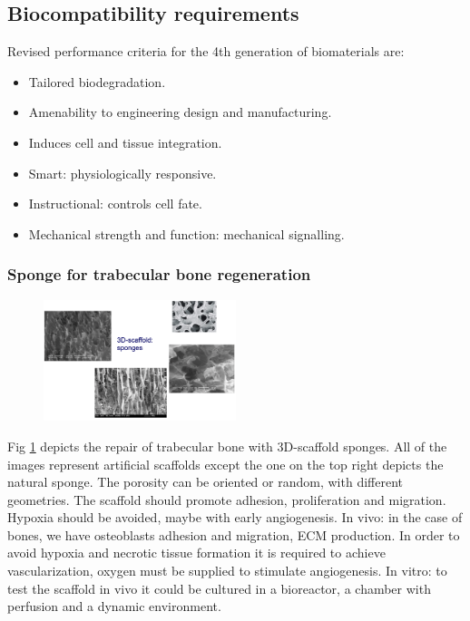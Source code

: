     \subsection{Biocompatibility requirements}
    Revised performance criteria for the 4th generation of biomaterials are:

    \begin{multicols}{2}
        \begin{itemize}
            \item Tailored biodegradation.
            \item Amenability to engineering design and manufacturing.
            \item Induces cell and tissue integration.
            \item Smart: physiologically responsive.
            \item Instructional: controls cell fate.
            \item Mechanical strength and function: mechanical signalling.
        \end{itemize}
    \end{multicols}

        \subsubsection{Sponge for trabecular bone regeneration}
        \begin{figure}[h]
            \centering
            \includegraphics[width=0.5\textwidth]{sponge.png}
            \caption{\label{fig:sponge}}
            \end{figure}
        \noindent
        Fig \ref{fig:sponge} depicts the repair of trabecular bone with 3D-scaffold sponges.
        All of the images represent artificial scaffolds except the one on the top right depicts the natural sponge.
        The porosity can be oriented or random, with different geometries.
        The scaffold should promote adhesion, proliferation and migration.
        Hypoxia should be avoided, maybe with early angiogenesis.
        In vivo: in the case of bones, we have osteoblasts adhesion and migration, ECM production.
        In order to avoid hypoxia and necrotic tissue formation it is required to achieve vascularization, oxygen must be supplied to stimulate angiogenesis.
        In vitro: to test the scaffold in vivo it could be cultured in a bioreactor, a chamber with perfusion and a dynamic environment.


